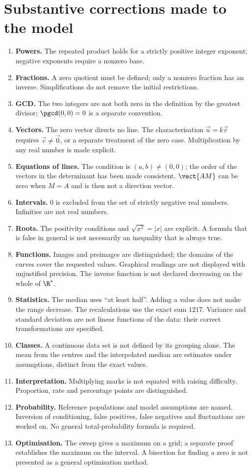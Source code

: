 \section*{Substantive corrections made to the model}
\begin{enumerate}
\item \textbf{Powers.} The repeated product holds for a strictly positive integer exponent; negative exponents require a nonzero base.
\item \textbf{Fractions.} A zero quotient must be defined; only a nonzero fraction has an inverse. Simplifications do not remove the initial restrictions.
\item \textbf{GCD.} The two integers are not both zero in the definition by the greatest divisor; $\pgcd(0,0)=0$ is a separate convention.
\item \textbf{Vectors.} The zero vector directs no line. The characterisation $\vec u=k\vec v$ requires $\vec v\ne\vec0$, or a separate treatment of the zero case. Multiplication by any real number is made explicit.
\item \textbf{Equations of lines.} The condition is $(a,b)\ne(0,0)$; the order of the vectors in the determinant has been made consistent. $\vect{AM}$ can be zero when $M=A$ and is then not a direction vector.
\item \textbf{Intervals.} $0$ is excluded from the set of strictly negative real numbers. Infinities are not real numbers.
\item \textbf{Roots.} The positivity conditions and $\sqrt{x^2}=|x|$ are explicit. A formula that is false in general is not necessarily an inequality that is always true.
\item \textbf{Functions.} Images and preimages are distinguished; the domains of the curves cover the requested values. Graphical readings are not displayed with unjustified precision. The inverse function is not declared decreasing on the whole of $\R^*$.
\item \textbf{Statistics.} The median uses ``at least half''. Adding a value does not make the range decrease. The recalculations use the exact sum $1217$. Variance and standard deviation are not linear functions of the data: their correct transformations are specified.
\item \textbf{Classes.} A continuous data set is not defined by its grouping alone. The mean from the centres and the interpolated median are estimates under assumptions, distinct from the exact values.
\item \textbf{Interpretation.} Multiplying marks is not equated with raising difficulty. Proportion, rate and percentage points are distinguished.
\item \textbf{Probability.} Reference populations and model assumptions are named. Inversion of conditioning, false positives, false negatives and fluctuations are worked on. No general total-probability formula is required.
\item \textbf{Optimisation.} The sweep gives a maximum on a grid; a separate proof establishes the maximum on the interval. A bisection for finding a zero is not presented as a general optimisation method.
\end{enumerate}

